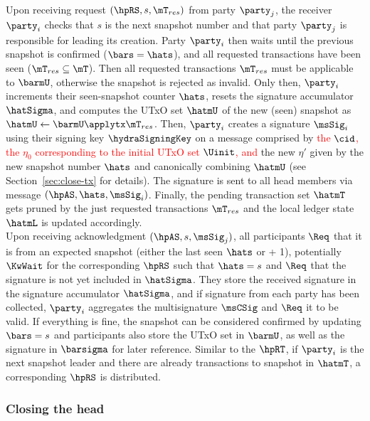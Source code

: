 \quad Upon receiving request $(\hpRS,s,\mT_{res})$ from
party $\party_j$, the receiver $\party_i$ checks that $s$ is the next snapshot
number and that party $\party_j$ is responsible for leading its
creation. Party $\party_i$ then waits until the previous
snapshot is confirmed ($\bars = \hats$), and all requested transactions have
been seen ($\mT_{res} \subseteq \mT$). Then all requested transactions $\mT_{res}$
must be applicable to $\barmU$, otherwise the snapshot is rejected as invalid.
Only then, $\party_i$ increments their seen-snapshot counter $\hats$, resets the
signature accumulator $\hatSigma$, and computes the UTxO set $\hatmU$ of the new
(seen) snapshot as $\hatmU \gets \barmU \applytx \mT_{res}$. Then, $\party_i$
creates a signature $\msSig_i$ using their signing key $\hydraSigningKey$ on a
message comprised by \textcolor{red}{the $\cid$, the $\eta_{0}$ corresponding to
	the initial UTxO set $\Uinit$, and} the new $\eta'$ given by the new snapshot
number $\hats$ and canonically combining $\hatmU$ (see
Section~\ref{sec:close-tx} for details). The signature is sent to all head
members via message $(\hpAS,\hats,\msSig_i)$. Finally, the pending transaction
set $\hatmT$ gets pruned by the just requested transactions $\mT_{res}$ and the
local ledger state $\hatmL$ is updated accordingly.\\

\quad Upon receiving acknowledgment $(\hpAS,s,\msSig_j)$,
all participants $\Req$ that it is from an expected snapshot (either the last
seen $\hats$ or + 1), potentially $\KwWait$ for the corresponding $\hpRS$ such
that $\hats = s$ and $\Req$ that the signature is not yet included in
$\hatSigma$. They store the received signature in the signature accumulator
$\hatSigma$, and if signature from each party has been collected, $\party_i$
aggregates the multisignature $\msCSig$ and $\Req$ it to be valid. If everything
is fine, the snapshot can be considered confirmed by updating $\bars=s$ and
participants also store the UTxO set in $\barmU$, as well as the signature in
$\barsigma$ for later reference. Similar to the $\hpRT$, if $\party_i$ is the
next snapshot leader and there are already transactions to snapshot in $\hatmT$,
a corresponding $\hpRS$ is distributed.

\subsubsection{Closing the head}

